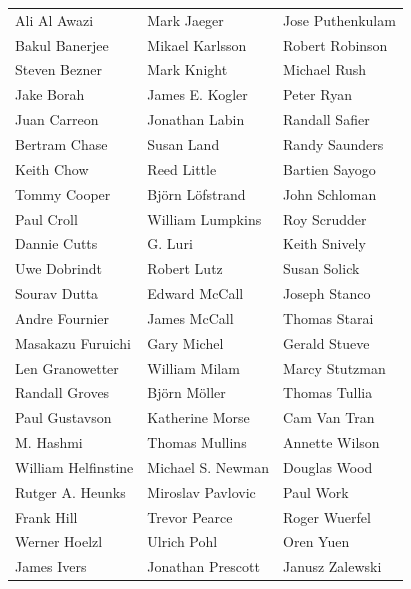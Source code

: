 {\fontsize{9}{10.0}\selectfont\centering
\renewcommand{\arraystretch}{1.04}
    \begin{tabular}{@{}>{\Centering\arraybackslash}p{132pt}@{\hspace{23pt}}>{\Centering\arraybackslash}p{129pt}@{\hspace{23pt}}>{\Centering\arraybackslash}p{123pt}@{}}
        Ali Al Awazi        & Mark Jaeger       & Jose Puthenkulam \\
        Bakul Banerjee      & Mikael Karlsson   & Robert Robinson  \\
        Steven Bezner       & Mark Knight       & Michael Rush     \\
        Jake Borah          & James E. Kogler   & Peter Ryan       \\
        Juan Carreon        & Jonathan Labin    & Randall Safier   \\
        Bertram Chase       & Susan Land        & Randy Saunders   \\
        Keith Chow          & Reed Little       & Bartien Sayogo   \\
        Tommy Cooper        & Björn Löfstrand   & John Schloman    \\
        Paul Croll          & William Lumpkins  & Roy Scrudder     \\
        Dannie Cutts        & G. Luri           & Keith Snively    \\
        Uwe Dobrindt        & Robert Lutz       & Susan Solick     \\
        Sourav Dutta        & Edward McCall     & Joseph Stanco    \\
        Andre Fournier      & James McCall      & Thomas Starai    \\
        Masakazu Furuichi   & Gary Michel       & Gerald Stueve    \\
        Len Granowetter     & William Milam     & Marcy Stutzman   \\
        Randall Groves      & Björn Möller      & Thomas Tullia    \\
        Paul Gustavson      & Katherine Morse   & Cam Van Tran     \\
        M. Hashmi           & Thomas Mullins    & Annette Wilson   \\
        William Helfinstine & Michael S. Newman & Douglas Wood     \\
        Rutger A. Heunks    & Miroslav Pavlovic & Paul Work        \\
        Frank Hill          & Trevor Pearce     & Roger Wuerfel    \\
        Werner Hoelzl       & Ulrich Pohl       & Oren Yuen        \\
        James Ivers         & Jonathan Prescott & Janusz Zalewski  \\
    \end{tabular}\par}
\newpage

